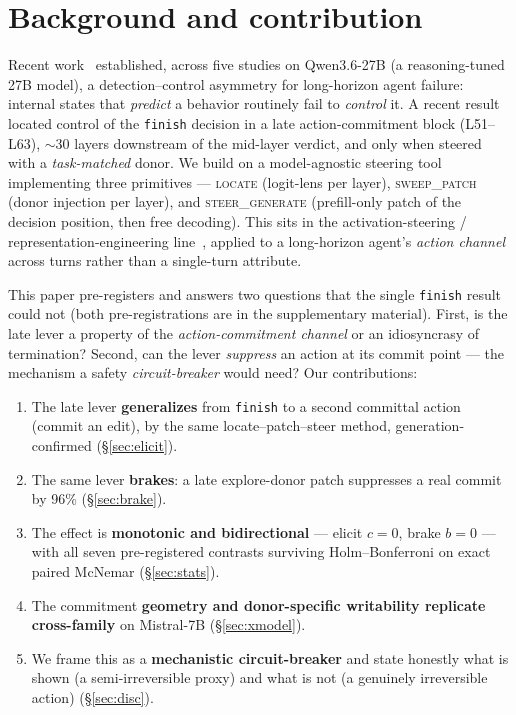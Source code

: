 \documentclass[11pt]{article}
\begin{document}
\section{Background and contribution}\label{sec:bg}
Recent work~\cite{toolentropy,rightlocus,verdict,leverislate} established, across five studies on Qwen3.6-27B (a reasoning-tuned 27B model), a
detection--control asymmetry for long-horizon agent failure: internal states that \emph{predict} a behavior
routinely fail to \emph{control} it. A recent result~\cite{leverislate} located control of the
\texttt{finish} decision in a late action-commitment block (L51--L63), $\sim$30 layers downstream of the
mid-layer verdict, and only when steered with a \emph{task-matched} donor. We build on a model-agnostic steering tool implementing three primitives --- \textsc{locate} (logit-lens
per layer), \textsc{sweep\_patch} (donor injection per layer), and \textsc{steer\_generate} (prefill-only patch
of the decision position, then free decoding). This sits in the activation-steering / representation-engineering line~\cite{actadd,repe}, applied to a long-horizon agent's \emph{action channel} across turns rather than a single-turn attribute.

This paper pre-registers and answers two questions that the single \texttt{finish} result could not
(both pre-registrations are in the supplementary material). First, is the late lever a property of
the \emph{action-commitment channel} or an idiosyncrasy of termination? Second, can the lever \emph{suppress} an
action at its commit point --- the mechanism a safety \emph{circuit-breaker} would need? Our contributions:
\begin{enumerate}\itemsep1pt
  \item The late lever \textbf{generalizes} from \texttt{finish} to a second committal action (commit an edit),
    by the same locate--patch--steer method, generation-confirmed (\S\ref{sec:elicit}).
  \item The same lever \textbf{brakes}: a late explore-donor patch suppresses a real commit by 96\%
    (\S\ref{sec:brake}).
  \item The effect is \textbf{monotonic and bidirectional} --- elicit $c{=}0$, brake $b{=}0$ --- with all seven
    pre-registered contrasts surviving Holm--Bonferroni on exact paired McNemar (\S\ref{sec:stats}).
  \item The commitment \textbf{geometry and donor-specific writability replicate cross-family} on Mistral-7B
    (\S\ref{sec:xmodel}).
  \item We frame this as a \textbf{mechanistic circuit-breaker} and state honestly what is shown (a
    semi-irreversible proxy) and what is not (a genuinely irreversible action) (\S\ref{sec:disc}).
\end{enumerate}
\end{document}
